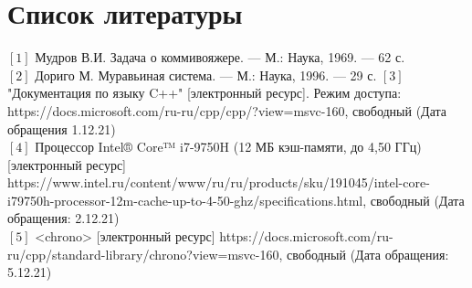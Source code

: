 %
\chapter{Список литературы}
\noindent$[1]$ Мудров В.И. Задача о коммивояжере. — М.: Наука, 1969. — 62 с.\\
$[2]$ Дориго М. Муравьиная система. — М.: Наука, 1996. — 29 с.
$[3]$ "Документация по языку C++" [электронный ресурс]. Режим доступа: https://docs.microsoft.com/ru-ru/cpp/cpp/?view=msvc-160, свободный (Дата обращения 1.12.21)\\
$[4]$ Процессор Intel® Core™ i7-9750H (12 МБ кэш-памяти, до 4,50 ГГц) [электронный ресурс] https://www.intel.ru/content/www/ru/ru/products/sku/191045/intel-core-i79750h-processor-12m-cache-up-to-4-50-ghz/specifications.html, свободный (Дата обращения: 2.12.21)\\
$[5]$ <chrono> [электронный ресурс] https://docs.microsoft.com/ru-ru/cpp/standard-library/chrono?view=msvc-160, свободный (Дата обращения: 5.12.21)\\